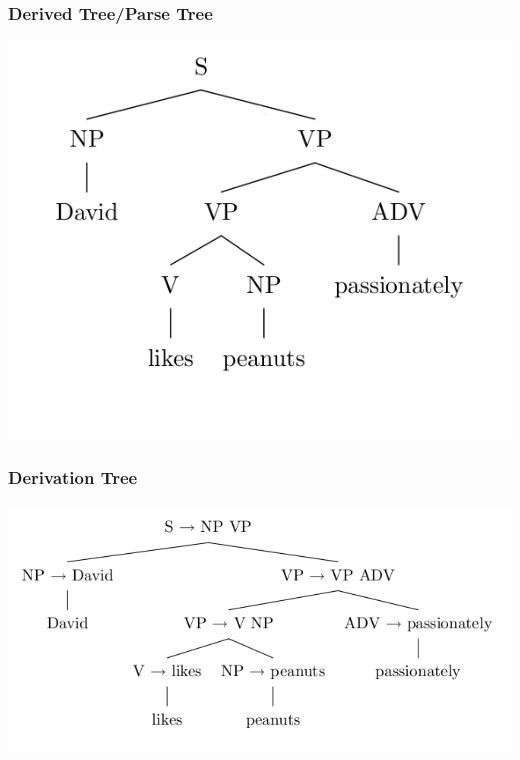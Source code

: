 \documentclass[compress,color=usenames]{beamer}
\begin{document}
\begin{frame}
\frametitle{Derived Tree/Parse Tree}

\begin{center}
\includegraphics[scale=.4]{pics/pic2-1.jpg}
\end{center}
\end{frame}

\begin{frame}
\frametitle{Derivation Tree}

\begin{center}
\includegraphics[scale=.4]{pics/pic2-2.jpg}
\end{center}
\end{frame}
\end{document}

